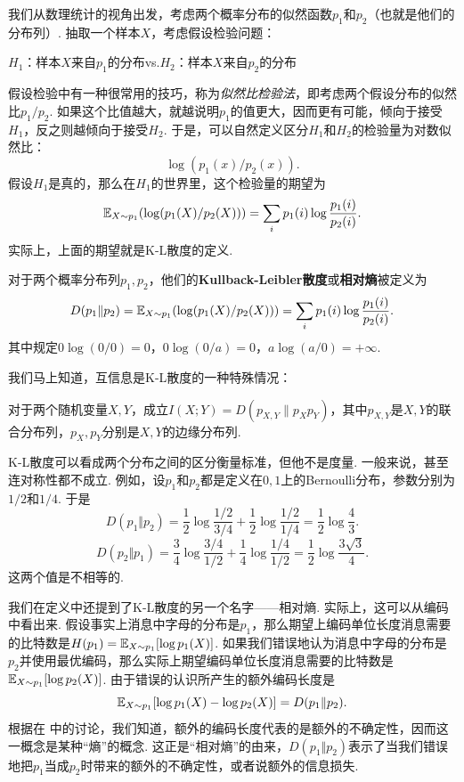 我们从数理统计的视角出发，考虑两个概率分布的似然函数$p_1$和$p_2$（也就是他们的分布列）. 抽取一个样本$X$，考虑假设检验问题：
\begin{center}
    $H_1$：样本$X$来自$p_1$的分布\quad vs.\quad $H_2$：样本$X$来自$p_2$的分布
\end{center}

假设检验中有一种很常用的技巧，称为\emph{似然比检验法}，即考虑两个假设分布的似然比$p_1/p_2$. 如果这个比值越大，就越说明$p_1$的值更大，因而更有可能，倾向于接受$H_1$，反之则越倾向于接受$H_2$. 于是，可以自然定义区分$H_1$和$H_2$的检验量为对数似然比：
\[\log(p_1(x)/p_2(x)).\]
假设$H_1$是真的，那么在$H_1$的世界里，这个检验量的期望为
    \[\mathbb{E}_{X\sim p_1}(\log(p_1(X)/p_2(X)))=\sum_ip_1(i)\log\frac{p_1(i)}{p_2(i)}.\]
实际上，上面的期望就是K-L散度的定义.
\begin{definition}
    对于两个概率分布列$p_1,p_2$，他们的\textbf{Kullback-Leibler散度}或\textbf{相对熵}被定义为
    \[D(p_1\| p_2)=\mathbb{E}_{X\sim p_1}(\log(p_1(X)/p_2(X)))=\sum_ip_1(i)\log\frac{p_1(i)}{p_2(i)}.\]
其中规定$0\log(0/0)=0$，$0\log(0/a)=0$，$a\log(a/0)=+\infty$.
\end{definition}
我们马上知道，互信息是K-L散度的一种特殊情况：
\begin{proposition}\label{prop:mutual-information-kl-divergence}
    对于两个随机变量$X,Y$，成立$I(X;Y)=D(p_{X,Y}\|p_Xp_Y)$，其中$p_{X,Y}$是$X,Y$的联合分布列，$p_X,p_Y$分别是$X,Y$的边缘分布列.
\end{proposition}

K-L散度可以看成两个分布之间的区分衡量标准，但他不是度量. 一般来说，甚至连对称性都不成立. 例如，设$p_1$和$p_2$都是定义在$0,1$上的Bernoulli分布，参数分别为$1/2$和$1/4$. 于是
\[D(p_1\Vert p_2) = \frac12\log\frac{1/2}{3/4} + \frac12\log\frac{1/2}{1/4} = \frac12\log\frac43.\]
\[D(p_2\Vert p_1) = \frac34\log\frac{3/4}{1/2} + \frac14\log\frac{1/4}{1/2} = \frac12\log\frac{3\sqrt3}{4}.\]
这两个值是不相等的. 

我们在定义中还提到了K-L散度的另一个名字——相对熵. 实际上，这可以从编码中看出来. 假设事实上消息中字母的分布是$p_1$，那么期望上编码单位长度消息需要的比特数是$H(p_1)=\mathbb{E}_{X\sim p_1}[\log p_1(X)]$. 如果我们错误地认为消息中字母的分布是$p_2$并使用最优编码，那么实际上期望编码单位长度消息需要的比特数是$\mathbb{E}_{X\sim p_1}[\log p_2(X)]$. 由于错误的认识所产生的额外编码长度是
\[\mathbb{E}_{X\sim p_1}[\log p_1(X)-\log p_2(X)]=D(p_1\Vert p_2).\]
根据在 中的讨论，我们知道，额外的编码长度代表的是额外的不确定性，因而这一概念是某种“熵”的概念. 这正是“相对熵”的由来，$D(p_1\Vert p_2)$表示了当我们错误地把$p_1$当成$p_2$时带来的额外的不确定性，或者说额外的信息损失.

